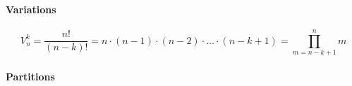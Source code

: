 \paragraph{Variations}
\begin{equation}
V_n^k = \frac{n!}{(n-k)!} 
      = n \cdot (n-1) \cdot (n-2) \cdot \ldots \cdot (n-k+1) 
      = \prod_{m=n-k+1}^{n} m
\end{equation}






\paragraph{Partitions}



\begin{comment}



\end{comment}

